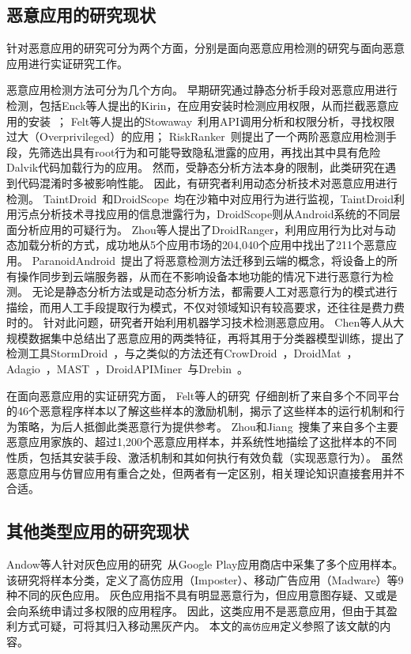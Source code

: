 \subsection{恶意应用的研究现状}
针对恶意应用的研究可分为两个方面，分别是面向恶意应用检测的研究与面向恶意应用进行实证研究工作。

恶意应用检测方法可分为几个方向。
早期研究通过静态分析手段对恶意应用进行检测，包括Enck等人提出的Kirin，在应用安装时检测应用权限，从而拦截恶意应用的安装~\cite{enck2009lightweight}；
Felt等人提出的Stowaway~\cite{felt2011android}利用API调用分析和权限分析，寻找权限过大（Overprivileged）的应用；
RiskRanker~\cite{grace2012riskranker}则提出了一个两阶恶意应用检测手段，先筛选出具有root行为和可能导致隐私泄露的应用，再找出其中具有危险Dalvik代码加载行为的应用。
然而，受静态分析方法本身的限制，此类研究在遇到代码混淆时多被影响性能。
因此，有研究者利用动态分析技术对恶意应用进行检测。
TaintDroid~\cite{enck2014taintdroid}和DroidScope~\cite{yan2012droidscope}均在沙箱中对应用行为进行监视，TaintDroid利用污点分析技术寻找应用的信息泄露行为，DroidScope则从Android系统的不同层面分析应用的可疑行为。
Zhou等人\cite{zhou2012hey}提出了DroidRanger，利用应用行为比对与动态加载分析的方式，成功地从5个应用市场的204,040个应用中找出了211个恶意应用。
ParanoidAndroid~\cite{portokalidis2010paranoid}提出了将恶意检测方法迁移到云端的概念，将设备上的所有操作同步到云端服务器，从而在不影响设备本地功能的情况下进行恶意行为检测。
无论是静态分析方法或是动态分析方法，都需要人工对恶意行为的模式进行描绘，而用人工手段提取行为模式，不仅对领域知识有较高要求，还往往是费力费时的。
针对此问题，研究者开始利用机器学习技术检测恶意应用。
Chen等人从大规模数据集中总结出了恶意应用的两类特征，再将其用于分类器模型训练，提出了检测工具StormDroid~\cite{chen2016stormdroid}，与之类似的方法还有CrowDroid~\cite{burguera2011crowdroid}，DroidMat~\cite{wu2012droidmat}，Adagio~\cite{gascon2013structural}，MAST~\cite{chakradeo2013mast}，DroidAPIMiner~\cite{aafer2013droidapiminer}与Drebin~\cite{arp2014drebin}。

在面向恶意应用的实证研究方面，
Felt等人的研究~\cite{Felt2011ASO}仔细剖析了来自多个不同平台的46个恶意程序样本以了解这些样本的激励机制，揭示了这些样本的运行机制和行为策略，为后人抵御此类恶意行为提供参考。
Zhou和Jiang~\cite{Zhou2012DissectingAM}搜集了来自多个主要恶意应用家族的、超过1,200个恶意应用样本，并系统性地描绘了这批样本的不同性质，包括其安装手段、激活机制和其如何执行有效负载（实现恶意行为）。
虽然恶意应用与仿冒应用有重合之处，但两者有一定区别，相关理论知识直接套用并不合适。

\subsection{其他类型应用的研究现状}
Andow等人针对灰色应用的研究~\cite{Andow2016ASO}从Google Play应用商店中采集了多个应用样本。
该研究将样本分类，定义了高仿应用（Imposter）、移动广告应用（Madware）等9种不同的灰色应用。
灰色应用指不具有明显恶意行为，但应用意图存疑、又或是会向系统申请过多权限的应用程序。
因此，这类应用不是恶意应用，但由于其盈利方式可疑，可将其归入移动黑灰产内。
本文的\texttt{高仿应用}定义参照了该文献的内容。

